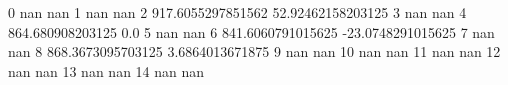 0 nan nan
1 nan nan
2 917.6055297851562 52.92462158203125
3 nan nan
4 864.680908203125 0.0
5 nan nan
6 841.6060791015625 -23.0748291015625
7 nan nan
8 868.3673095703125 3.6864013671875
9 nan nan
10 nan nan
11 nan nan
12 nan nan
13 nan nan
14 nan nan
